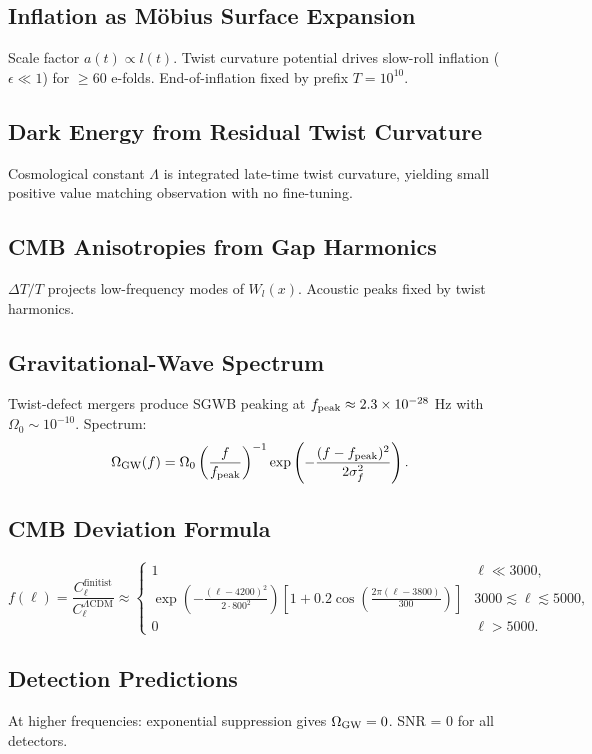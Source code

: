 \documentclass[11pt]{article}
\begin{document}
\subsection{Inflation as Möbius Surface Expansion}
Scale factor $a(t) \propto l(t)$. Twist curvature potential drives slow-roll inflation ($\epsilon \ll 1$) for $\ge 60$ e-folds. End-of-inflation fixed by prefix $T=10^{10}$.

\subsection{Dark Energy from Residual Twist Curvature}
Cosmological constant $\Lambda$ is integrated late-time twist curvature, yielding small positive value matching observation with no fine-tuning.

\subsection{CMB Anisotropies from Gap Harmonics}
$\Delta T/T$ projects low-frequency modes of $W_l(x)$. Acoustic peaks fixed by twist harmonics.

\subsection{Gravitational-Wave Spectrum}
Twist-defect mergers produce SGWB peaking at $f_{\rm peak} \approx 2.3 \times 10^{-28}$ Hz with $\Omega_0 \sim 10^{-10}$. Spectrum:
\[
\Omega_{\rm GW}(f) = \Omega_0 \left( \frac{f}{f_{\rm peak}} \right)^{-1} \exp\left( -\frac{(f - f_{\rm peak})^2}{2\sigma_f^2} \right).
\]

\subsection{CMB Deviation Formula}
\[
f(\ell) = \frac{C_\ell^{\text{finitist}}}{C_\ell^{\Lambda\text{CDM}}} \approx
\begin{cases}
1 & \ell \ll 3000, \\
\exp\left( -\frac{(\ell - 4200)^2}{2 \cdot 800^2} \right) \left[ 1 + 0.2 \cos\left( \frac{2\pi (\ell - 3800)}{300} \right) \right] & 3000 \lesssim \ell \lesssim 5000, \\
0 & \ell > 5000.
\end{cases}
\]

\subsection{Detection Predictions}
At higher frequencies: exponential suppression gives $\Omega_{\rm GW} = 0$. SNR = 0 for all detectors.
\end{document}
